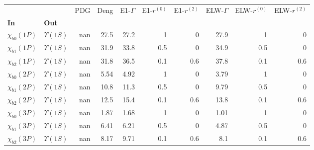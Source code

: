 \begin{tabular}{l|l|r|r|r|r|r|r|r|r}
\toprule
                &                &  PDG &  Deng &  E1-$\Gamma$ &  E1-$r^{(0)}$ &  E1-$r^{(2)}$ &  ELW-$\Gamma$ &  ELW-$r^{(0)}$ &  ELW-$r^{(2)}$ \\
\textbf{In} & \textbf{Out} &      &       &              &               &               &               &                &                \\
\midrule
\textbf{$\chi_{b0}(1P)$} & \textbf{$\Upsilon(1S)$} &  nan &  27.5 &         27.2 &             1 &             0 &          27.9 &              1 &              0 \\
\textbf{$\chi_{b1}(1P)$} & \textbf{$\Upsilon(1S)$} &  nan &  31.9 &         33.8 &           0.5 &             0 &          34.9 &            0.5 &              0 \\
\textbf{$\chi_{b2}(1P)$} & \textbf{$\Upsilon(1S)$} &  nan &  31.8 &         36.5 &           0.1 &           0.6 &          37.8 &            0.1 &            0.6 \\
\textbf{$\chi_{b0}(2P)$} & \textbf{$\Upsilon(1S)$} &  nan &  5.54 &         4.92 &             1 &             0 &          3.79 &              1 &              0 \\
\textbf{$\chi_{b1}(2P)$} & \textbf{$\Upsilon(1S)$} &  nan &  10.8 &         11.3 &           0.5 &             0 &          9.79 &            0.5 &              0 \\
\textbf{$\chi_{b2}(2P)$} & \textbf{$\Upsilon(1S)$} &  nan &  12.5 &         15.4 &           0.1 &           0.6 &          13.8 &            0.1 &            0.6 \\
\textbf{$\chi_{b0}(3P)$} & \textbf{$\Upsilon(1S)$} &  nan &  1.87 &         1.68 &             1 &             0 &          1.01 &              1 &              0 \\
\textbf{$\chi_{b1}(3P)$} & \textbf{$\Upsilon(1S)$} &  nan &  6.41 &         6.21 &           0.5 &             0 &          4.87 &            0.5 &              0 \\
\textbf{$\chi_{b2}(3P)$} & \textbf{$\Upsilon(1S)$} &  nan &  8.17 &         9.71 &           0.1 &           0.6 &           8.1 &            0.1 &            0.6 \\
\bottomrule
\end{tabular}
